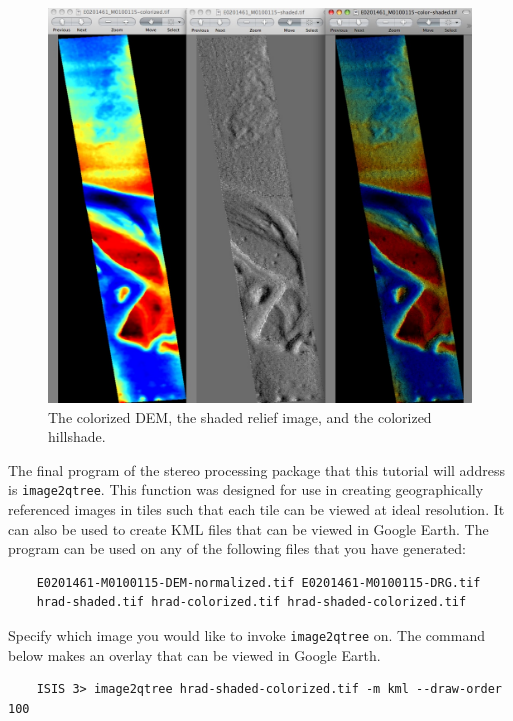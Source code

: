 \begin{figure}
\begin{center}
\includegraphics[width=5in]{images/p19-colorized-shaded.png}
\caption[Hrad colorized and shaded relief]{
    \label{hrad-color}
	The colorized DEM, the shaded relief image, and the colorized hillshade.
    }
\end{center}
\end{figure}

The final program of the stereo processing package that this tutorial
will address is \texttt{image2qtree}.  This function was designed
for use in creating geographically referenced images in tiles such
that each tile can be viewed at ideal resolution. It can also be
used to create KML files that can be viewed in Google Earth. The
program can be used on any of the following files that you have
generated: \begin{verbatim}
    E0201461-M0100115-DEM-normalized.tif E0201461-M0100115-DRG.tif
    hrad-shaded.tif hrad-colorized.tif hrad-shaded-colorized.tif
\end{verbatim}

Specify which image you would like to invoke \texttt{image2qtree}
on. The command below makes an overlay that can be viewed in Google
Earth.

\begin{verbatim}
    ISIS 3> image2qtree hrad-shaded-colorized.tif -m kml --draw-order 100
\end{verbatim}


